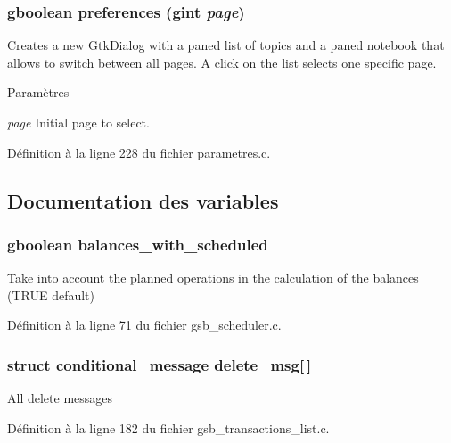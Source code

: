 \subsubsection[{preferences}]{\setlength{\rightskip}{0pt plus 5cm}gboolean preferences (gint {\em page})}\label{parametres_8c_a11ca21a8e0c2101e89252e4b391530bf}
Creates a new GtkDialog with a paned list of topics and a paned notebook that allows to switch between all pages. A click on the list selects one specific page.


\begin{DoxyParams}{Paramètres}
\item[{\em page}]Initial page to select. \end{DoxyParams}


Définition à la ligne 228 du fichier parametres.c.



\subsection{Documentation des variables}
\subsubsection[{balances\_\-with\_\-scheduled}]{\setlength{\rightskip}{0pt plus 5cm}gboolean {\bf balances\_\-with\_\-scheduled}}\label{parametres_8c_a2f70ab8aa9d2a494c0653e8f29eddf40}
Take into account the planned operations in the calculation of the balances (TRUE default) 

Définition à la ligne 71 du fichier gsb\_\-scheduler.c.

\subsubsection[{delete\_\-msg}]{\setlength{\rightskip}{0pt plus 5cm}struct {\bf conditional\_\-message} {\bf delete\_\-msg}[$\,$]}\label{parametres_8c_a8be9044200783277533661fc770e77f5}
All delete messages 

Définition à la ligne 182 du fichier gsb\_\-transactions\_\-list.c.

